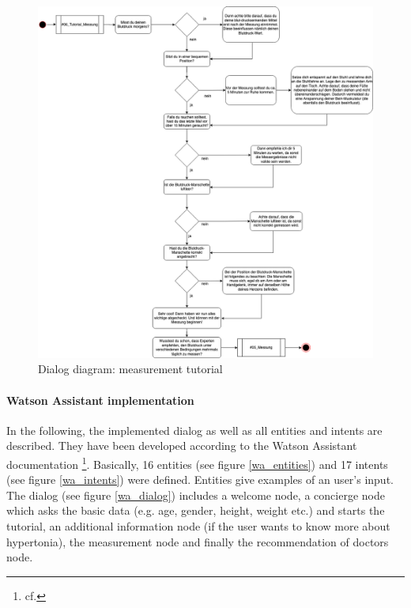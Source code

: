 \begin{figure}[h]
	\centering
	\includegraphics[width=1\textwidth]{images/06_tutorial_messung.png}
	\caption{Dialog diagram: measurement tutorial}
	\label{dialog_diagram_04}
\end{figure}


\paragraph{Watson Assistant implementation}

In the following, the implemented dialog as well as all entities and intents are described. They have been developed according to the Watson Assistant documentation \footnote{cf.\autocite{wa_docu}}.
Basically, 16 entities (see figure \ref{wa_entities}) and 17 intents (see figure \ref{wa_intents}) were defined. Entities give examples of an user's input.
The dialog (see figure \ref{wa_dialog}) includes a welcome node, a concierge node which asks the basic data (e.g. age, gender, height, weight etc.) and starts the tutorial, an additional information node (if the user wants to know more about hypertonia), the measurement node and finally the recommendation of doctors node.

